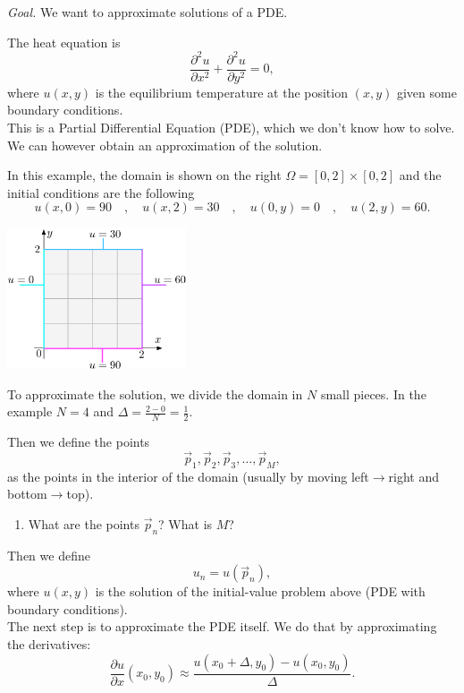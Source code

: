 \emph{Goal. } We want to approximate solutions of a PDE. \\




\begin{minipage}{11cm}

The heat equation is
$$
\frac{\partial^2 u}{\partial x^2} + \frac{\partial^2 u}{\partial y^2} = 0,
$$
where $u(x,y)$ is the equilibrium temperature at the position $(x,y)$ given some boundary conditions. \\

This is a Partial Differential Equation (PDE), which we don't know how to solve. We can however obtain an approximation of the solution.

In this example, the domain is shown on the right $\Omega = [0,2] \times [0,2]$ and the initial conditions are the following
$$
u(x,0)=90 
\quad , \quad u(x,2)=30
\quad , \quad u(0,y)=0
\quad , \quad u(2,y)=60.
$$
\hfill
\end{minipage}
\hfill
\begin{minipage}{150pt}
\includegraphics*[width=150pt]{images/project-numericalPDE-domain.pdf}
\end{minipage}

To approximate the solution, we divide the domain in $N$ small pieces. In the example $N=4$ and $\Delta = \frac{2-0}{N}=\frac12$.

Then we define the points
$$
\vec{p}_1, \vec{p}_2, \vec{p}_3, \ldots , \vec{p}_M,
$$
as the points in the interior of the domain (usually by moving left$\to$right and bottom$\to$top).

\begin{enumerate}[label=\emph{\arabic*.}] 
\item What are the points $\vec{p}_n$? What is $M$?
\end{enumerate}

Then we define
$$
u_n = u(\vec{p}_n),
$$
where $u(x,y)$ is the solution of the initial-value problem above (PDE with boundary conditions). \\

The next step is to approximate the PDE itself. We do that by approximating the derivatives:
$$
\frac{\partial u}{\partial x}(x_0,y_0) \approx \frac{u(x_0+\Delta,y_0)-u(x_0,y_0)}{\Delta}.
$$

